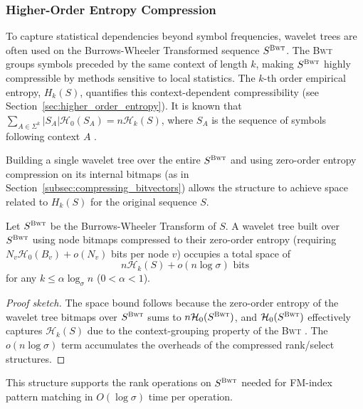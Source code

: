\subsubsection{Higher-Order Entropy Compression} \label{subsec:higher_order_entropy}

To capture statistical dependencies beyond symbol frequencies, wavelet trees are often used on the Burrows-Wheeler Transformed \cite{burrows1994block} sequence $S^{\textsc{Bwt}}$. The \textsc{Bwt} groups symbols preceded by the same context of length $k$, making $S^{\textsc{Bwt}}$ highly compressible by methods sensitive to local statistics. The $k$-th order empirical entropy, $H_k(S)$, quantifies this context-dependent compressibility (see Section~\ref{sec:higher_order_entropy}). It is known that $\sum_{A \in \Sigma^k} |S_A| \mathcal{H}_0(S_A) = n \mathcal{H}_k(S)$, where $S_A$ is the sequence of symbols following context $A$ \cite{manzini2001analysis}.

Building a single wavelet tree over the entire $S^{\textsc{Bwt}}$ and using zero-order entropy compression on its internal bitmaps (as in Section~\ref{subsec:compressing_bitvectors}) allows the structure to achieve space related to $H_k(S)$ for the original sequence $S$.

\begin{theorem} \label{thm:hk_wt_space}
    Let $S^{\textsc{Bwt}}$ be the Burrows-Wheeler Transform of $S$. A wavelet tree built over $S^{\textsc{Bwt}}$ using node bitmaps compressed to their zero-order entropy (requiring $N_v \mathcal{H}_0(B_v) + o(N_v)$ bits per node $v$) occupies a total space of
    \[ n \mathcal{H}_k(S) + o(n \log \sigma) \text{ bits} \]
    for any $k \le \alpha \log_\sigma n$ ($0 < \alpha < 1$).
\end{theorem}
\begin{proof}[Proof sketch]
    The space bound follows because the zero-order entropy of the wavelet tree bitmaps over $S^{\textsc{Bwt}}$ sums to $n \mathcal{H}_0(S^{\textsc{Bwt}})$, and $\mathcal{H}_0(S^{\textsc{Bwt}})$ effectively captures $\mathcal{H}_k(S)$ due to the context-grouping property of the \textsc{Bwt} \cite{manzini2001analysis, navarro2007compressed}. The $o(n \log \sigma)$ term accumulates the overheads of the compressed rank/select structures.
\end{proof}

This structure supports the \textsf{rank} operations on $S^{\textsc{Bwt}}$ needed for FM-index pattern matching in $O(\log \sigma)$ time per operation.


